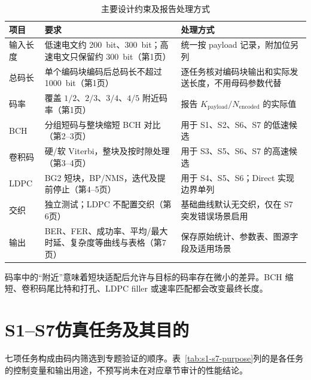 \begin{table}[htbp]
  \centering
  \small
  \caption{主要设计约束及报告处理方式}
  \label{tab:requirement-constraints}
  \begin{tabular}{p{}p{}p{}}
    \toprule
    项目 & 要求 & 处理方式 \\
    \midrule
    输入长度 & 低速电文约 \SI{200}{bit}、\SI{300}{bit}；高速电文只保留约 \SI{300}{bit}（第1页） & 统一按 payload 记录，附加位另列 \\
    总码长 & 单个编码块编码后总码长不超过 \SI{1000}{bit}（第1页） & 逐任务核对编码块输出和实际发送长度，不用母码参数代替 \\
    码率 & 覆盖 $1/2$、$2/3$、$3/4$、$4/5$ 附近码率（第1页） & 报告 $K_{\mathrm{payload}}/N_{\mathrm{encoded}}$ 的实际值 \\
    BCH & 分组短码与整块缩短 BCH 对比（第2--3页） & 用于 S1、S2、S6、S7 的低速候选 \\
    卷积码 & 硬/软 Viterbi，整块及按时隙处理（第3--4页） & 用于 S3、S5、S6、S7 的高速候选 \\
    LDPC & BG2 短块，BP/NMS，迭代及提前停止（第4--5页） & 用于 S4、S5、S6；Direct 实现边界单列 \\
    交织 & 独立测试；LDPC 不配置交织（第6页） & 基础曲线默认无交织，仅在 S7 突发错误场景启用 \\
    输出 & BER、FER、成功率、平均/最大时延、复杂度等曲线与表格（第7页） & 保存原始统计、参数表、图源字段及适用场景 \\
    \bottomrule
  \end{tabular}
\end{table}

码率中的“附近”意味着短块适配后允许与目标的码率存在微小的差异。BCH 缩短、卷积码尾比特和打孔、LDPC filler 或速率匹配都会改变最终长度。

\section{S1--S7仿真任务及其目的}

七项任务构成由码内筛选到专题验证的顺序。表~\ref{tab:s1-s7-purpose}列的是各任务的控制变量和输出用途，不预写尚未在对应章节审计的性能结论。

